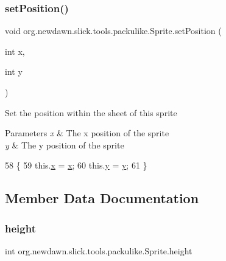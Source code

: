 \subsubsection{\texorpdfstring{set\+Position()}{setPosition()}}
{\footnotesize\ttfamily void org.\+newdawn.\+slick.\+tools.\+packulike.\+Sprite.\+set\+Position (\begin{DoxyParamCaption}\item[{int}]{x,  }\item[{int}]{y }\end{DoxyParamCaption})\hspace{0.3cm}{\ttfamily [inline]}}

Set the position within the sheet of this sprite


\begin{DoxyParams}{Parameters}
{\em x} & The x position of the sprite \\
\hline
{\em y} & The y position of the sprite \\
\hline
\end{DoxyParams}

\begin{DoxyCode}
58                                           \{
59         this.\mbox{\hyperlink{classorg_1_1newdawn_1_1slick_1_1tools_1_1packulike_1_1_sprite_a9bd0b6392ca72a997c8bbd9631fb6dab}{x}} = \mbox{\hyperlink{classorg_1_1newdawn_1_1slick_1_1tools_1_1packulike_1_1_sprite_a9bd0b6392ca72a997c8bbd9631fb6dab}{x}};
60         this.\mbox{\hyperlink{classorg_1_1newdawn_1_1slick_1_1tools_1_1packulike_1_1_sprite_a513b034525fe70842f69ff900ab3783a}{y}} = \mbox{\hyperlink{classorg_1_1newdawn_1_1slick_1_1tools_1_1packulike_1_1_sprite_a513b034525fe70842f69ff900ab3783a}{y}};
61     \}
\end{DoxyCode}


\subsection{Member Data Documentation}
\mbox{\label{classorg_1_1newdawn_1_1slick_1_1tools_1_1packulike_1_1_sprite_a33d551a688d84bce77065b00c4309eab}} 
\subsubsection{\texorpdfstring{height}{height}}
{\footnotesize\ttfamily int org.\+newdawn.\+slick.\+tools.\+packulike.\+Sprite.\+height\hspace{0.3cm}{\ttfamily [private]}}

